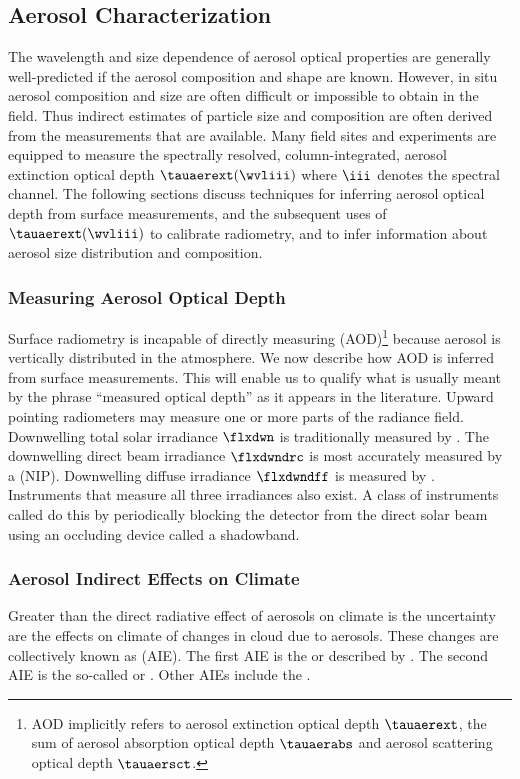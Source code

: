 \documentclass[12pt]{article}
\begin{document}
\subsection[Aerosol Characterization]{Aerosol Characterization}\label{sxn:aer_chr}
The wavelength and size dependence of aerosol optical properties 
are generally well-predicted if the aerosol composition and shape are
known. 
However, in situ aerosol composition and size are often difficult or 
impossible to obtain in the field.
Thus indirect estimates of particle size and composition are often
derived from the measurements that are available.
Many field sites and experiments are equipped to measure 
the spectrally resolved, column-integrated, aerosol extinction optical 
depth $\tauaerext(\wvliii)$ where $\iii$ denotes the spectral channel.
The following sections discuss techniques for inferring aerosol
optical depth from surface measurements, and the subsequent uses of
$\tauaerext(\wvliii)$ to calibrate radiometry, and to infer
information about aerosol size distribution and composition.

\subsubsection{Measuring Aerosol Optical Depth}\label{sxn:aod_msr}
Surface radiometry is incapable of directly measuring 
 (AOD)\footnote{AOD implicitly refers to 
aerosol extinction optical depth $\tauaerext$, the sum of aerosol
absorption optical depth $\tauaerabs$ and aerosol scattering optical
depth $\tauaersct$.} because aerosol is vertically distributed in the
atmosphere. 
We now describe how AOD is inferred from surface measurements.
This will enable us to qualify what is usually meant by the
phrase ``measured optical depth'' as it appears in the literature.
Upward pointing radiometers may measure one or more parts of the
radiance field.
Downwelling total solar irradiance $\flxdwn$ is traditionally measured by
. 
The downwelling direct beam irradiance $\flxdwndrc$ is most accurately
measured by a  (NIP).
Downwelling diffuse irradiance $\flxdwndff$ is measured by
. 
Instruments that measure all three irradiances also exist.
A class of instruments called  do this
by periodically blocking the detector from the direct solar beam
using an occluding device called a shadowband.

\subsubsection{Aerosol Indirect Effects on Climate}\label{sxn:aer_ndr}
Greater than the direct radiative effect of aerosols on climate is the
uncertainty are the effects on climate of changes in cloud due to
aerosols.
These changes are collectively known as  (AIE). 
The first AIE is the  or  described by \cite{Two77}.
The second AIE is the so-called  or 
.
Other AIEs include the .
\end{document}
